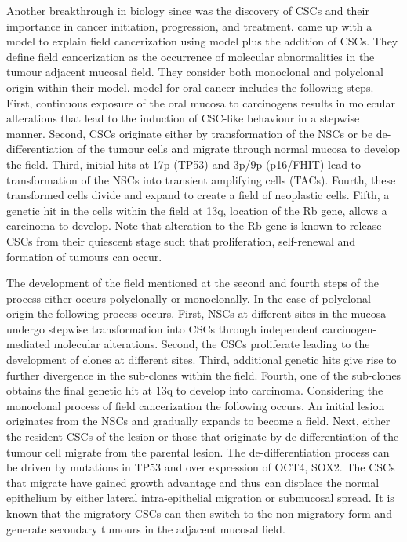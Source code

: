 \documentclass[\main/thesis.tex]{subfiles}
\begin{document}
Another breakthrough in biology since \textcite{Slaughter} was the discovery 
of CSCs and their importance in cancer initiation, progression, and treatment. 
\textcite{Simple} came up with a model to explain field cancerization using 
\textcite{Braakhuis} model plus the addition of CSCs. They define field 
cancerization as the occurrence of molecular abnormalities in the tumour 
adjacent mucosal field. They consider both monoclonal and polyclonal origin 
within their model. \textcite{Simple} model for oral cancer includes the 
following steps. First, continuous exposure of the oral mucosa to carcinogens 
results in molecular alterations that lead to the induction of CSC-like 
behaviour in a stepwise manner. Second, CSCs originate either by transformation 
of the NSCs or be de-differentiation of the tumour cells and migrate through 
normal mucosa to develop the field. Third, initial hits at 17p (TP53) and 3p/9p 
(p16/FHIT) lead to transformation of the NSCs into transient amplifying cells 
(TACs). Fourth, these transformed cells divide and expand to create a field of 
neoplastic cells. Fifth, a genetic hit in the cells within the field at 13q, 
location of the Rb gene, allows a carcinoma to develop. Note that alteration to 
the Rb gene is known to release CSCs from their quiescent stage such that 
proliferation, self-renewal and formation of tumours can occur. 

The development of the field mentioned at the second and fourth steps of the 
process either occurs polyclonally or monoclonally. In the case of polyclonal 
origin the following process occurs. First, NSCs at different sites in the 
mucosa undergo stepwise transformation into CSCs through independent 
carcinogen-mediated molecular alterations. Second, the CSCs proliferate leading 
to the development of clones at different sites. Third, additional genetic hits 
give rise to further divergence in the sub-clones within the field. Fourth, one 
of the sub-clones obtains the final genetic hit at 13q to develop into 
carcinoma. Considering the monoclonal process of field cancerization the 
following occurs. An initial lesion originates from the NSCs and gradually 
expands to become a field. Next, either the resident CSCs of the lesion or those 
that originate by de-differentiation of the tumour cell migrate from the 
parental lesion. The de-differentiation process can be driven by mutations in 
TP53 and over expression of OCT4, SOX2. The CSCs that migrate have gained growth 
advantage and thus can displace the normal epithelium by either lateral 
intra-epithelial migration or submucosal spread. It is known that the migratory 
CSCs can then switch to the non-migratory form and generate secondary tumours in 
the adjacent mucosal field. 
\end{document}
